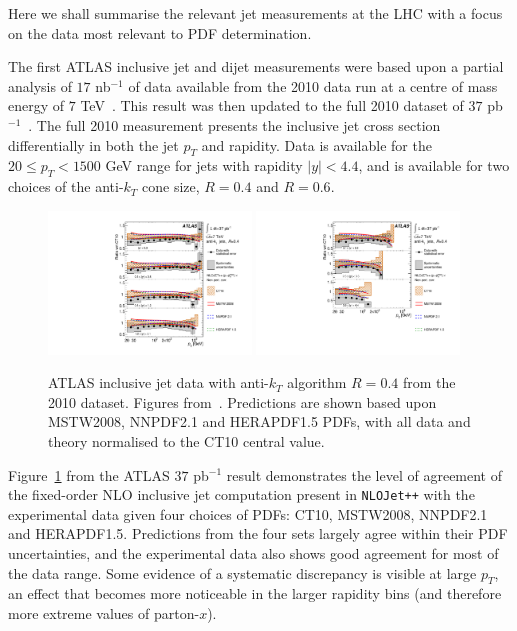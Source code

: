  Here we shall summarise the relevant jet measurements at the LHC with a focus on the data most relevant to PDF determination.

The first ATLAS inclusive jet and dijet measurements were based upon a partial analysis of $17$ nb$^{-1}$ of data available from the 2010 data run at a centre of mass energy of $7$ TeV~\cite{Aad:2010ad}. This result was then updated to the full 2010 dataset of $37$ pb$^{-1}$~\cite{Aad:2011fc}.
The full 2010 measurement presents the inclusive jet cross section differentially in both the jet $p_T$ and rapidity. Data is available for the $20 \le p_T < 1500$ GeV range for jets with rapidity $|y|<4.4$, and is available for two choices of the anti-$k_T$ cone size, $R=0.4$ and $R=0.6$.
\begin{figure}[ht]
\centering
\includegraphics[width=0.48\textwidth]{5-LHCdata/figs/fig_12a.pdf}
\includegraphics[width=0.48\textwidth]{5-LHCdata/figs/fig_12b.pdf}
\caption[ATLAS inclusive jet data with anti-$k_T$ algorithm $R=0.4$]{ATLAS inclusive jet data with anti-$k_T$ algorithm $R=0.4$ from the 2010 dataset. Figures from~\cite{Aad:2011fc}. Predictions are shown based upon MSTW2008, NNPDF2.1 and HERAPDF1.5 PDFs, with all data and theory normalised to the CT10 central value.}
\label{fig:ATLASR04Jets}
\end{figure}

Figure~\ref{fig:ATLASR04Jets} from the ATLAS $37$ pb$^{-1}$ result demonstrates the level of agreement of the fixed-order NLO inclusive jet computation present in {\tt NLOJet++} with the experimental data given four choices of PDFs: CT10, MSTW2008, NNPDF2.1 and HERAPDF1.5. Predictions from the four sets largely agree within their PDF uncertainties, and the experimental data also shows good agreement for most of the data range. Some evidence of a systematic discrepancy is visible at large $p_T$, an effect that becomes more noticeable in the larger rapidity bins (and therefore more extreme values of parton-$x$).  

